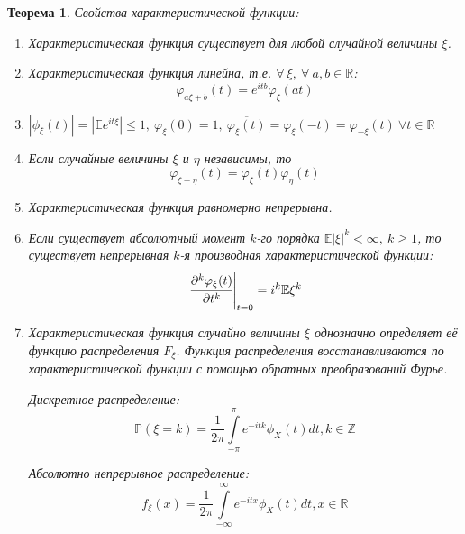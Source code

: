 \documentclass[oneside,final,14pt]{extreport}
\newtheorem{thm}{Теорема}[section]
\theoremstyle{definition}
\begin{document}
\begin{thm}
    Свойства характеристической функции:
    \begin{enumerate}
        \item Характеристическая функция существует для любой случайной величины $\xi$.
        \item Характеристическая функция линейна, т.е. $\forall~ \xi,~ \forall~ a, b \in \mathbb{R}$:
        \begin{equation*}
            \varphi_{a \xi + b}(t) = e^{itb} \varphi_{\xi}(at)
        \end{equation*}
        \item $|\phi_{\xi}(t)|=|\mathbb{E} e^{i t \xi}| \leqslant 1,~ \varphi_{\xi}(0) = 1, ~\overline{\varphi_{\xi}(t)} = \varphi_{\xi}(-t) = \varphi_{-\xi}(t) ~\forall t \in \mathbb{R}$
        \item Если случайные величины $\xi$ и $\eta$ независимы, то
        \begin{equation*}
            \varphi_{\xi + \eta}(t) = \varphi_{\xi}(t) \varphi_{\eta}(t)
        \end{equation*}
        \item Характеристическая функция равномерно непрерывна.
        \item Если существует абсолютный момент $k$-го порядка $\mathbb{E}|\xi|^{k} < \infty,~ k \geqslant 1$, то существует непрерывная $k$-я производная характеристической функции:
        \begin{equation*}
            \left.\cfrac{\partial^{k} \varphi_{\xi}(t)}{\partial t^{k}}\right|_{t=0}= i^{k} \mathbb{E} \xi^{k}
        \end{equation*}
        \item Характеристическая функция случайно величины $\xi$ однозначно определяет её функцию распределения $F_{\xi}$. Функция распределения восстанавливаются по характеристической функции с помощью обратных преобразований Фурье.
        
        Дискретное распределение:
        \begin{equation*}
            \mathbb{P}(\xi=k)=\frac{1}{2 \pi} \int\limits_{-\pi}^{\pi} e^{-i t k} \phi_{X}(t) d t, k \in \mathbb{Z}
        \end{equation*}
        
        Абсолютно непрерывное распределение:
        \begin{equation*}
            f_{\xi}(x)=\frac{1}{2 \pi} \int\limits_{-\infty}^{\infty} e^{-i t x} \phi_{X}(t) d t, x \in \mathbb{R}
        \end{equation*}
    \end{enumerate}
\end{thm}
\end{document}
